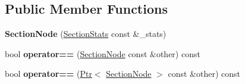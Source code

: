 \subsection*{Public Member Functions}
\begin{DoxyCompactItemize}
\item 
\hypertarget{struct_catch_1_1_cumulative_reporter_base_1_1_section_node_adee3ee947f61300bc72266ee007cc1bd}{{\bfseries Section\-Node} (\hyperlink{struct_catch_1_1_section_stats}{Section\-Stats} const \&\-\_\-stats)}\label{struct_catch_1_1_cumulative_reporter_base_1_1_section_node_adee3ee947f61300bc72266ee007cc1bd}

\item 
\hypertarget{struct_catch_1_1_cumulative_reporter_base_1_1_section_node_a4e852b8db8f2ca9da3f2306e6d1099f0}{bool {\bfseries operator==} (\hyperlink{struct_catch_1_1_cumulative_reporter_base_1_1_section_node}{Section\-Node} const \&other) const }\label{struct_catch_1_1_cumulative_reporter_base_1_1_section_node_a4e852b8db8f2ca9da3f2306e6d1099f0}

\item 
\hypertarget{struct_catch_1_1_cumulative_reporter_base_1_1_section_node_a9e66ed9cd0cc7a124270d544340991c0}{bool {\bfseries operator==} (\hyperlink{class_catch_1_1_ptr}{Ptr}$<$ \hyperlink{struct_catch_1_1_cumulative_reporter_base_1_1_section_node}{Section\-Node} $>$ const \&other) const }\label{struct_catch_1_1_cumulative_reporter_base_1_1_section_node_a9e66ed9cd0cc7a124270d544340991c0}

\end{DoxyCompactItemize}
